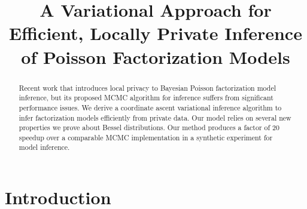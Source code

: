 \documentclass[letterpaper]{article}
\title{A Variational Approach for Efficient, Locally Private Inference of Poisson Factorization Models}
\author{} %
\begin{document}
\maketitle

\begin{abstract}
    Recent work that introduces local privacy to Bayesian Poisson factorization
    model inference, but its proposed MCMC algorithm for inference suffers from
    significant performance issues. We derive a coordinate ascent variational
    inference algorithm to infer factorization models efficiently from private
    data. Our model relies on several new properties we prove about Bessel
    distributions. Our method produces a factor of 20 speedup over a comparable
    MCMC implementation in a synthetic experiment for model inference.
  \end{abstract}

  \section{Introduction}
  
\end{document}
